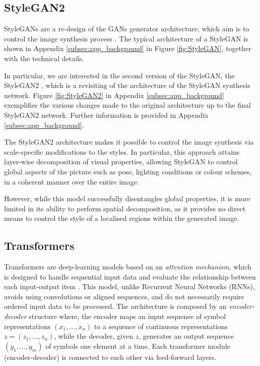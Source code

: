\documentclass{article}
\begin{document}
	\subsection{StyleGAN2}\label{sec:StyleGAN}
	StyleGANs are a re-design of the GANs generator architecture, which aim is to control the image 
	synthesis process \cite{karras2019style}. The typical architecture of a StyleGAN is shown in 
	Appendix \ref{subsec:app_background} in Figure \ref{fig:StyleGAN}, together with the technical 
	details. 
	
	In particular, we are interested in the second version of the StyleGAN, the StyleGAN2 
	\cite{karras2020analyzing}, which is a revisiting of the architecture of the StyleGAN synthesis 
	network. Figure \ref{fig:StyleGAN2} in Appendix \ref{subsec:app_background} exemplifies the 
	various changes made to the original architecture up to the final StyleGAN2 network. Further 
	information is provided in Appendix \ref{subsec:app_background}.
	
	The StyleGAN2 architecture makes it possible to control the image synthesis via scale-specific modifications to the styles. In particular, this approach attains layer-wise decomposition of visual 
	properties, allowing StyleGAN to control global aspects of the picture such as pose, lighting 
	conditions or colour schemes, in a coherent manner over the entire image.
	
	However, while this model successfully disentangles global properties, it is more limited in its ability 
	to perform spatial decomposition, as it provides no direct means to control the style of a localised 
	regions within the generated image.
	
	\subsection{Transformers}\label{sec:transformer}
	Transformers are deep-learning models based on an \textit{attention mechanism}, which is 
	designed 
	to handle sequential input data and evaluate the relationship between each input-output item 
	\cite{vaswani2017attention}.
	This model, unlike Recurrent Neural Networks (RNNs), avoids using convolutions or aligned sequences, and do not necessarily require ordered input data to be processed. 
	The architecture is composed by an \textit{encoder-decoder} structure where, the {encoder} maps an input sequence of symbol representations $(x_1,\dots, x_n)$ to a sequence of continuous 
	representations $z = (z_1, \dots, z_n)$, while the  {decoder}, given $z$, generates an output 
	sequence $(y_1, \dots, y_m)$ of symbols one element at a time. 
	Each transformer module (encoder-decoder) is connected to each other via feed-forward
	layers.
	
\end{document}
